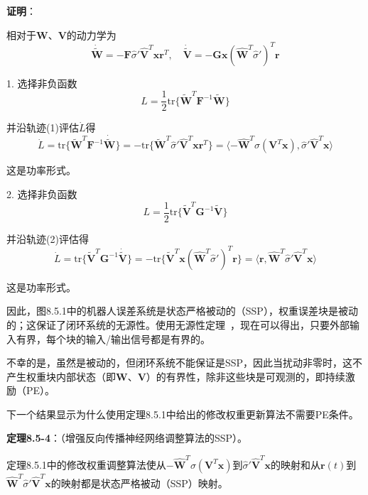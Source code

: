 \documentclass[12pt,a4paper]{ctexart}
\begin{document}
\textbf{证明}：

相对于$\bm{W}$、$\bm{V}$的动力学为
\begin{equation}
\dot{\tilde{\bm{W}}} = -\bm{F}\hat{\sigma}'\hat{\bm{V}}^T\bm{x}\bm{r}^T, \quad \dot{\tilde{\bm{V}}} = -\bm{G}\bm{x}(\hat{\bm{W}}^T\hat{\sigma}')^T\bm{r}
\end{equation}

1. 选择非负函数
\begin{equation}
L = \frac{1}{2}\text{tr}\{\tilde{\bm{W}}^T \bm{F}^{-1} \tilde{\bm{W}}\}
\end{equation}

并沿轨迹(1)评估$\dot{L}$得
\begin{equation}
\dot{L} = \text{tr}\{\tilde{\bm{W}}^T \bm{F}^{-1} \dot{\tilde{\bm{W}}}\} = -\text{tr}\{\tilde{\bm{W}}^T \hat{\sigma}'\hat{\bm{V}}^T\bm{x}\bm{r}^T\} = \langle -\hat{\bm{W}}^T\sigma(\bm{V}^T\bm{x}), \hat{\sigma}'\hat{\bm{V}}^T\bm{x} \rangle
\end{equation}

这是功率形式。

2. 选择非负函数
\begin{equation}
L = \frac{1}{2}\text{tr}\{\tilde{\bm{V}}^T \bm{G}^{-1} \tilde{\bm{V}}\}
\end{equation}

并沿轨迹(2)评估得
\begin{equation}
\dot{L} = \text{tr}\{\tilde{\bm{V}}^T \bm{G}^{-1} \dot{\tilde{\bm{V}}}\} = -\text{tr}\{\tilde{\bm{V}}^T \bm{x}(\hat{\bm{W}}^T\hat{\sigma}')^T\bm{r}\} = \langle \bm{r}, \hat{\bm{W}}^T\hat{\sigma}'\hat{\bm{V}}^T\bm{x} \rangle
\end{equation}

这是功率形式。

因此，图8.5.1中的机器人误差系统是状态严格被动的（SSP），权重误差块是被动的；这保证了闭环系统的无源性。使用无源性定理~\cite{slotine1991}，现在可以得出，只要外部输入有界，每个块的输入/输出信号都是有界的。

不幸的是，虽然是被动的，但闭环系统不能保证是SSP，因此当扰动非零时，这不产生权重块内部状态（即$\bm{W}$、$\bm{V}$）的有界性，除非这些块是可观测的，即持续激励（PE）。

下一个结果显示为什么使用定理8.5.1中给出的修改权重更新算法不需要PE条件。

\textbf{定理8.5-4}：（增强反向传播神经网络调整算法的SSP）。

定理8.5.1中的修改权重调整算法使从$-\hat{\bm{W}}^T\sigma(\bm{V}^T\bm{x})$到$\hat{\sigma}'\hat{\bm{V}}^T\bm{x}$的映射和从$\bm{r}(t)$到$\hat{\bm{W}}^T\hat{\sigma}'\hat{\bm{V}}^T\bm{x}$的映射都是状态严格被动（SSP）映射。
\end{document}
